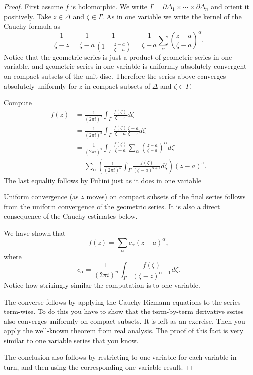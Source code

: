 \documentclass[12pt,openany]{book}
\theoremstyle{plain}
\theoremstyle{remark}
\theoremstyle{definition}
\theoremstyle{exercise}
\theoremstyle{example}
\begin{document}
\begin{proof}
First assume $f$ is holomorphic.
We write
$\Gamma = \partial \Delta_1 \times \cdots \times \partial \Delta_n$
and orient it positively.
Take $z \in \Delta$ and $\zeta \in \Gamma$.
As in one variable we write the kernel of the Cauchy
formula as
\begin{equation*}
\frac{1}{\zeta-z} =
\frac{1}{\zeta-a}\frac{1}{\left(1-\frac{z-a}{\zeta-a}\right)} =
\frac{1}{\zeta-a}
\sum_{\alpha}
{\left(\frac{z-a}{\zeta-a}\right)}^\alpha .
\end{equation*}
Notice that the geometric series is just a product of geometric series
in one variable, and geometric series in one variable
is uniformly absolutely convergent on compact subsets of the unit disc.
Therefore the series
above converges absolutely uniformly for $z$ in compact subsets of $\Delta$
and $\zeta \in \Gamma$.

Compute
\begin{equation*}
\begin{split}
f(z)
& =
\frac{1}{{(2\pi i)}^n}
\int_{\Gamma}
\frac{f(\zeta)}{\zeta-z}
d \zeta 
\\
& =
\frac{1}{{(2\pi i)}^n}
\int_{\Gamma}
\frac{f(\zeta)}{\zeta-a}
\frac{\zeta-a}{\zeta-z}
d \zeta 
\\
& =
\frac{1}{{(2\pi i)}^n}
\int_{\Gamma}
\frac{f(\zeta)}{\zeta-a}
\sum_{\alpha}
{\left(\frac{z-a}{\zeta-a}\right)}^{\alpha}
d \zeta 
\\
& =
\sum_{\alpha}
\left(
\frac{1}{{(2\pi i)}^n}
\int_{\Gamma}
\frac{f(\zeta)}{{(\zeta-a)}^{\alpha+1}}
d \zeta 
\right)
{(z-a)}^{\alpha} .
\end{split}
\end{equation*}
The last equality follows by Fubini just as it does in one
variable.

Uniform convergence (as $z$ moves) on compact subsets of the final series follows from the
uniform convergence of the geometric series.  It is also a direct
consequence of the Cauchy estimates below.

We have shown that
\begin{equation*}
f(z) =
\sum_{\alpha}
c_{\alpha}
{(z-a)}^{\alpha} ,
\end{equation*}
where
\begin{equation*}
c_\alpha
=
\frac{1}{{(2\pi i)}^n}
\int_{\Gamma}
\frac{f(\zeta)}{{(\zeta-z)}^{\alpha+1}}
d \zeta .
\end{equation*}
Notice how strikingly similar the computation is to one variable.

The converse follows by applying the Cauchy-Riemann equations to the series
term-wise.  To do this you have to show that the term-by-term derivative
series also converges uniformly on compact subsets.  It is left as an
exercise.  Then you apply the well-known theorem from real analysis.
The proof of this fact is very similar to one variable series that you know.

The conclusion also follows by restricting to one variable for each variable
in turn, and then using the corresponding one-variable result.
\end{proof}
\end{document}
